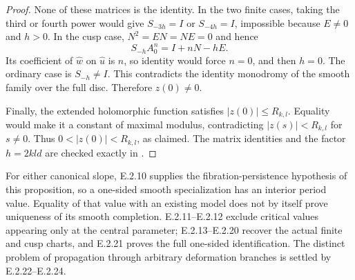 \begin{proof}
None of these matrices is the identity.  In the two
finite cases, taking the third or fourth power would
give $S_{-3h}=I$ or $S_{-4h}=I$, impossible because
$E\ne0$ and $h>0$.  In the cusp case, $N^2=EN=NE=0$
and hence
\[
 S_{-h}A_0^n=I+nN-hE.
\]
Its coefficient of $\widehat w$ on $\widehat u$ is
$n$, so identity would force $n=0$, and then $h=0$.
The ordinary case is $S_{-h}\ne I$.  This contradicts
the identity monodromy of the smooth family over
the full disc.  Therefore $z(0)\ne0$.

Finally, the extended holomorphic function satisfies
$|z(0)|\le R_{k,l}$.  Equality would make it a constant
of maximal modulus, contradicting $|z(s)|<R_{k,l}$
for $s\ne0$.  Thus $0<|z(0)|<R_{k,l}$, as claimed.
The matrix identities and the factor $h=2kld$ are
checked exactly in .
\end{proof}

\begin{remark}
For either canonical slope, E.2.10 supplies the
fibration-persistence hypothesis of this proposition,
so a one-sided smooth specialization has an interior
period value.  Equality of that value with an existing
model does not by itself prove uniqueness of its smooth
completion.  E.2.11--E.2.12 exclude critical values
appearing only at the central parameter; E.2.13--E.2.20
recover the actual finite and cusp charts, and E.2.21
proves the full one-sided identification.  The distinct
problem of propagation through arbitrary deformation
branches is settled by E.2.22--E.2.24.
\end{remark}
